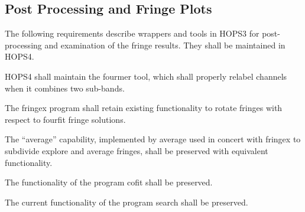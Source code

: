 
\subsection{Post Processing and Fringe Plots}
\label{sec:postprocreq}

The following requirements describe wrappers and tools in HOPS3 for 
post-processing and examination of the fringe results. They shall be
maintained in HOPS4.


\begin{description}
 HOPS4 shall maintain the \acs{fourmer} tool, which shall properly 
relabel channels when it combines two sub-bands.

 The \acs{fringex} program shall retain existing functionality to rotate
fringes with respect to fourfit fringe solutions.

 The ``average'' capability, implemented by \acs{average} used in 
concert with \acs{fringex} to subdivide explore and average fringes, shall be 
preserved with equivalent functionality.

 The functionality of the program \acs{cofit} shall be preserved.

 The current functionality of the program \acs{search} shall be 
preserved.



\end{description}
